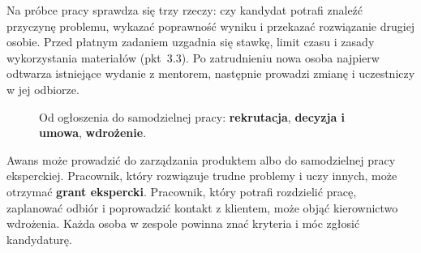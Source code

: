 \documentclass[11pt,a4paper]{report}
\begin{document}
Na próbce pracy sprawdza się trzy rzeczy: czy kandydat potrafi znaleźć przyczynę problemu, wykazać poprawność wyniku i przekazać rozwiązanie drugiej osobie. Przed płatnym zadaniem uzgadnia się stawkę, limit czasu i zasady wykorzystania materiałów (pkt~3.3). Po zatrudnieniu nowa osoba najpierw odtwarza istniejące wydanie z mentorem, następnie prowadzi zmianę i uczestniczy w jej odbiorze.

\begin{figure}[H]
\centering
{}
\caption{Od ogłoszenia do samodzielnej pracy: \textcolor{cWZ}{\textbf{rekrutacja}}, \textcolor{cRD}{\textbf{decyzja i umowa}}, \textcolor{cDW}{\textbf{wdrożenie}}.}
\end{figure}

Awans może prowadzić do zarządzania produktem albo do samodzielnej pracy eksperckiej. Pracownik, który rozwiązuje trudne problemy i uczy innych, może otrzymać \textbf{grant ekspercki}. Pracownik, który potrafi rozdzielić pracę, zaplanować odbiór i poprowadzić kontakt z klientem, może objąć kierownictwo wdrożenia. Każda osoba w zespole powinna znać kryteria i móc zgłosić kandydaturę.
\end{document}

